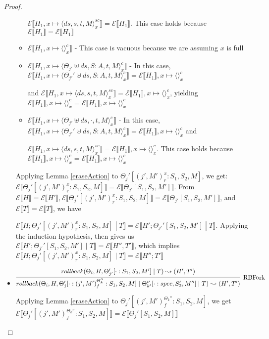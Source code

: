 \documentclass[9pt]{article}
\newcommand{\erase}[1]{\mathcal{E}\llbracket #1 \rrbracket}
\begin{document}
\begin{proof}
\begin{itemize}
\begin{itemize}
	$\erase{H_1, x \mapsto \langle ds, s, t, M\rangle_x^{sc}} = \erase{H_1}$.  This case holds because $\erase{H_1} = \erase{H_1}$
\item  $\erase{H_1, x \mapsto \langle\rangle_x^c} $ - This case is vacuous because we are assuming $x$ is full
\item  $\erase{H_1, x\mapsto \langle \Theta_{j'} \uplus ds, S : A, t, M\rangle_x^c} $ - In this case, $\erase{H_1, x \mapsto \langle \Theta_{j'}' \uplus ds, S : A, t, M\rangle_x^c} = \erase{H_1}, x \mapsto \langle\rangle_x^c$ 

and $\erase{H_1, x \mapsto \langle ds, s, t, M\rangle_x^{sc}} = \erase{H_1}, x\mapsto \langle\rangle_x^c$, yielding  $\erase{H_1}, x\mapsto \langle\rangle_x^c = \erase{H_1}, x\mapsto \langle\rangle_x^c$
\item  $\erase{H_1, x \mapsto \langle \Theta_{j'} \uplus ds, \cdot, t, M\rangle_x^c} $ - In this case, $\erase{H_1, x \mapsto \langle \Theta_{j'}' \uplus ds, S : A, t, M\rangle_x^c} = \erase{H_1}, x \mapsto \langle\rangle_x^c$ and 

	$\erase{H_1, x \mapsto \langle ds, s, t, M\rangle_x^{sc}} = \erase{H_1}, x\mapsto \langle\rangle_x^c$.  This case holds because $\erase{H_1}, x\mapsto \langle\rangle_x^c = \erase{H_1}, x\mapsto \langle\rangle_x^c$
\end{itemize}

Applying Lemma \ref{eraseAction} to $\Theta_j'[(j', M')_r^x : S_1, S_2, M]$, we get: $\erase{\Theta_j'[(j', M')_r^x : S_1, S_2, M]} = \erase{\Theta_{j'}[S_1, S_2, M']}$.  
From $\erase{H} = \erase{H'}, \erase{\Theta_j'[(j', M')_r^x : S_1, S_2, M]} = \erase{\Theta_{j'}[S_1, S_2, M']}$, and $\erase{T} = \erase{T}$, we have 

$\erase{H; \Theta_j'[(j', M')_r^x : S_1, S_2, M] \; | \; T} = \erase{H'; \Theta_{j'}'[S_1, S_2, M'] \; | \; T}$.  Applying the induction hypothesis, then gives us $\erase{H'; \Theta_{j'}'[S_1, S_2, M'] \; | \; T} = \erase{H'', T'}$, which implies $\erase{H; \Theta_j'[(j', M')_r^x : S_1, S_2, M] \; | \; T} = \erase{H''; T'}$

\item $\infer[\text{RBFork}]{rollback(\Theta_i, H, \Theta_j'[\cdot : (j', M')_f^{\Theta_k''} : S_1, S_2, M] \; | \; \Theta_{k'}''[\cdot : spec, S_2', M''] \; | \; T) \leadsto (H', T')}{rollback(\Theta_i, H, \Theta_{j'}'[\cdot : S_1, S_2, M'] \; | \; T) \leadsto (H', T')}$

Applying Lemma \ref{eraseAction} to $\Theta_j'[(j', M')_f^{\Theta_k''} : S_1, S_2, M]$, we get $\erase{\Theta_j'[(j', M')_f^{\Theta_k''} : S_1, S_2, M]} = \erase{\Theta_j'[S_1, S_2, M]}$


\end{itemize}
\end{proof}
\end{document}
